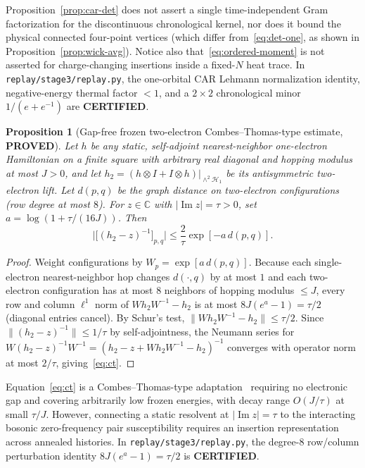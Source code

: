 \documentclass[11pt]{article}
\newtheorem{proposition}{Proposition}
\theoremstyle{remark}
\newcommand{\proved}{\textbf{PROVED}}
\newcommand{\certified}{\textbf{CERTIFIED}}
\begin{document}
Proposition~\ref{prop:car-det} does not assert a single time-independent Gram factorization for the discontinuous chronological kernel, nor does it bound the physical connected four-point vertices (which differ from~\eqref{eq:det-one}, as shown in Proposition~\ref{prop:wick-avg}). Notice also that~\eqref{eq:ordered-moment} is not asserted for charge-changing insertions inside a fixed-$N$ heat trace. In \texttt{replay/stage3/replay.py}, the one-orbital CAR Lehmann normalization identity, negative-energy thermal factor $<1$, and a $2\times 2$ chronological minor $1/(e+e^{-1})$ are \certified{}.

\begin{proposition}[Gap-free frozen two-electron Combes--Thomas-type estimate, \proved]\label{prop:ct}
Let $h$ be any static, self-adjoint nearest-neighbor one-electron Hamiltonian on a finite square with arbitrary real diagonal and hopping modulus at most $J>0$, and let $h_2=(h\otimes I+I\otimes h)|_{\wedge^2\mathcal H_1}$ be its antisymmetric two-electron lift. Let $d(p,q)$ be the graph distance on two-electron configurations (row degree at most $8$). For $z\in\mathbb C$ with $|\operatorname{Im}z|=\tau>0$, set $a=\log(1+\tau/(16J))$. Then
\begin{equation}\label{eq:ct}
 \bigl|\bigl[(h_2-z)^{-1}\bigr]_{p,q}\bigr| \le \frac{2}{\tau}\exp[-a\,d(p,q)].
\end{equation}
\end{proposition}

\begin{proof}
Weight configurations by $W_p=\exp[a\,d(p,q)]$. Because each single-electron nearest-neighbor hop changes $d(\cdot,q)$ by at most $1$ and each two-electron configuration has at most $8$ neighbors of hopping modulus $\le J$, every row and column $\ell^1$ norm of $W h_2 W^{-1}-h_2$ is at most $8J(e^a-1)=\tau/2$ (diagonal entries cancel). By Schur's test, $\|W h_2 W^{-1}-h_2\|\le\tau/2$. Since $\|(h_2-z)^{-1}\|\le 1/\tau$ by self-adjointness, the Neumann series for $W(h_2-z)^{-1}W^{-1}=(h_2-z+W h_2 W^{-1}-h_2)^{-1}$ converges with operator norm at most $2/\tau$, giving~\eqref{eq:ct}.
\end{proof}

Equation~\eqref{eq:ct} is a Combes--Thomas-type adaptation~\cite{combesthomas} requiring no electronic gap and covering arbitrarily low frozen energies, with decay range $O(J/\tau)$ at small $\tau/J$. However, connecting a static resolvent at $|\operatorname{Im}z|=\tau$ to the interacting bosonic zero-frequency pair susceptibility requires an insertion representation across annealed histories. In \texttt{replay/stage3/replay.py}, the degree-$8$ row/column perturbation identity $8J(e^a-1)=\tau/2$ is \certified{}.
\end{document}
